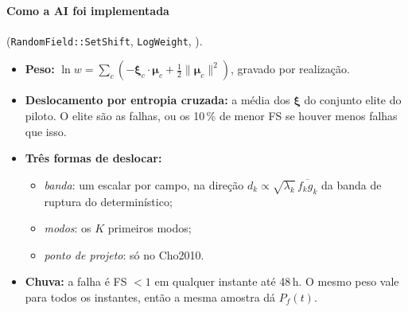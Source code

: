 \paragraph{Como a AI foi implementada} (\texttt{RandomField::SetShift}, \texttt{LogWeight},
).
\begin{itemize}
  \item \textbf{Peso:} $\ln w = \sum_c(-\bm\xi_c\cdot\bm\mu_c + \frac12\|\bm\mu_c\|^2)$, gravado por realização.
  \item \textbf{Deslocamento por entropia cruzada:} a média dos $\bm\xi$ do conjunto elite do piloto. O elite são as
    falhas, ou os 10\,\% de menor FS se houver menos falhas que isso.
  \item \textbf{Três formas de deslocar:}
    \begin{itemize}
      \item \emph{banda}: um escalar por campo, na direção $d_k \propto \sqrt{\lambda_k}\,\overline{f_k g_k}$ da banda de
        ruptura do determinístico;
      \item \emph{modos}: os $K$ primeiros modos;
      \item \emph{ponto de projeto}: só no Cho2010.
    \end{itemize}
  \item \textbf{Chuva:} a falha é FS $< 1$ em qualquer instante até 48\,h. O mesmo peso vale para todos os instantes,
    então a mesma amostra dá $P_f(t)$.
\end{itemize}

